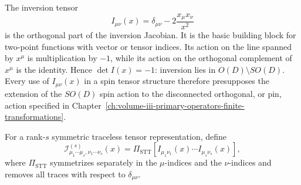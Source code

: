 \begin{definition}
\label{def:inversion-stt-parallel-transport}
The inversion tensor
\begin{equation}
  I_{\mu\nu}(x)
  =
  \delta_{\mu\nu}-2\frac{x_\mu x_\nu}{x^2}
  \label{eq:inversion-tensor}
\end{equation}
is the orthogonal part of the inversion Jacobian.  It is the basic
building block for two-point functions with vector or tensor indices.  Its
action on the line spanned by \(x^\mu\) is multiplication by \(-1\), while its
action on the orthogonal complement of \(x^\mu\) is the identity.  Hence
\(\det I(x)=-1\): inversion lies in \(O(D)\setminus SO(D)\).  Every use of
\(I_{\mu\nu}(x)\) in a spin tensor structure therefore presupposes the extension
of the \(SO(D)\) spin action to the disconnected orthogonal, or pin, action
specified in Chapter~\ref{ch:volume-iii-primary-operators-finite-transformations}.

For a rank-\(s\) symmetric traceless tensor representation, define
\[
  \mathcal I^{(s)}_{\mu_1\cdots\mu_s,\nu_1\cdots\nu_s}(x)
  =
  \Pi_{\operatorname{STT}}
  \left[
    I_{\mu_1\nu_1}(x)\cdots I_{\mu_s\nu_s}(x)
  \right],
\]
where \(\Pi_{\operatorname{STT}}\) symmetrizes separately in the
\(\mu\)-indices and the \(\nu\)-indices and removes all traces with respect to
\(\delta_{\mu\nu}\).
\end{definition}

